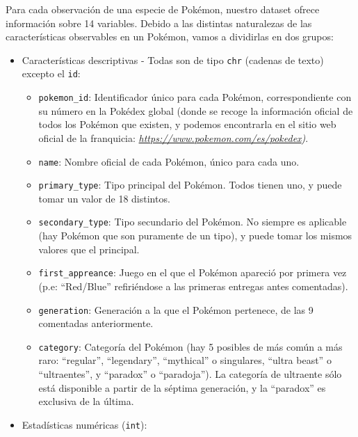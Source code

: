 \documentclass[
  12pt,
]{extreport}
\begin{document}
Para cada observación de una especie de Pokémon, nuestro dataset ofrece
información sobre 14 variables. Debido a las distintas naturalezas de
las características observables en un Pokémon, vamos a dividirlas en dos
grupos:

\begin{itemize}
\item
  Características descriptivas - Todas son de tipo \texttt{chr} (cadenas
  de texto) excepto el \texttt{id}:

  \begin{itemize}
  \item
    \texttt{pokemon\_id}: Identificador único para cada Pokémon,
    correspondiente con su número en la Pokédex global (donde se recoge
    la información oficial de todos los Pokémon que existen, y podemos
    encontrarla en el sitio web oficial de la franquicia:
    \href{https://www.pokemon.com/es/pokedex}{\emph{https://www.pokemon.com/es/pokedex}}\emph{)}.
  \item
    \texttt{name}: Nombre oficial de cada Pokémon, único para cada uno.
  \item
    \texttt{primary\_type}: Tipo principal del Pokémon. Todos tienen
    uno, y puede tomar un valor de 18 distintos.
  \item
    \texttt{secondary\_type}: Tipo secundario del Pokémon. No siempre es
    aplicable (hay Pokémon que son puramente de un tipo), y puede tomar
    los mismos valores que el principal.
  \item
    \texttt{first\_appreance}: Juego en el que el Pokémon apareció por
    primera vez (p.e: ``Red/Blue'' refiriéndose a las primeras entregas
    antes comentadas).
  \item
    \texttt{generation}: Generación a la que el Pokémon pertenece, de
    las 9 comentadas anteriormente.
  \item
    \texttt{category}: Categoría del Pokémon (hay 5 posibles de más
    común a más raro: ``regular'', ``legendary'', ``mythical'' o
    singulares, ``ultra beast'' o ``ultraentes'', y ``paradox'' o
    ``paradoja''). La categoría de ultraente sólo está disponible a
    partir de la séptima generación, y la ``paradox'' es exclusiva de la
    última.
  \end{itemize}
\item
  Estadísticas numéricas (\texttt{int}):


\end{itemize}
\end{document}
